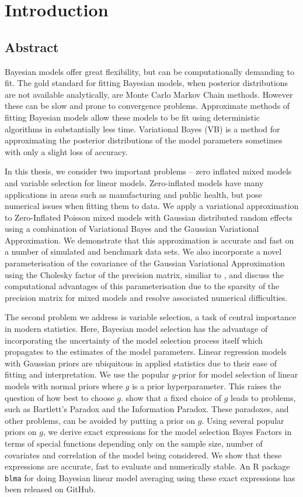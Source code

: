 \chapter{Introduction}

\section{Abstract}

Bayesian models offer great flexibility, but can be computationally demanding
to fit. The gold standard for fitting Bayesian models, when posterior
distributions are not available analytically, are Monte Carlo Markov Chain
methods. However these can be slow and prone to convergence problems.
Approximate methods of fitting Bayesian models allow these models to be fit
using deterministic algorithms in substantially less time.  Variational Bayes
(VB) is a method for approximating the posterior distributions of the model
parameters sometimes with only a slight loss of accuracy.

In this thesis, we consider two important problems -- zero inflated mixed
models and variable selection for linear models. Zero-inflated models have many
applications in areas such as manufacturing and public health, but pose
numerical issues when fitting them to data. We apply a variational
approximation to Zero-Inflated Poisson mixed models with Gaussian distributed
random effects using a combination of Variational Bayes and the Gaussian
Variational Approximation. We demonstrate that this approximation is accurate
and fast on a number of simulated and benchmark data sets. We also incorporate
a novel parameterisation of the covariance of the Gaussian Variational
Approximation using the Cholesky factor of the precision matrix, similiar to
\cite{Tan2018}, and discuss the computational advantages of this
parameterisation due to the sparsity of the precision matrix for mixed models
and resolve associated numerical difficulties.

The second problem we address is variable selection, a task of central
importance in modern statistics. Here, Bayesian model selection has the
advantage of incorporating the uncertainty of the model selection process
itself which propagates to the estimates of the model  parameters. Linear
regression models with Gaussian priors are ubiquitous in applied statistics due
to their ease of fitting and interpretation. We use the popular $g$-prior
\cite{Zellner1986} for model selection of linear models with normal priors
where $g$ is a prior hyperparameter. This raises the question of how best to
choose $g$. \cite{Liang2008} show that a fixed choice of $g$ leads to problems,
such as Bartlett's Paradox and the Information Paradox. These paradoxes, and
other problems, can be avoided by putting a prior on $g$. Using several popular
priors on $g$, we derive exact expressions for the model selection Bayes
Factors in terms of special functions depending only on  the sample size,
number of covariates and correlation of the model being considered. We show
that these expressions are accurate, fast to evaluate and numerically stable.
An R package \texttt{blma} for doing Bayesian linear model averaging using
these exact expressions has been  released on GitHub.

